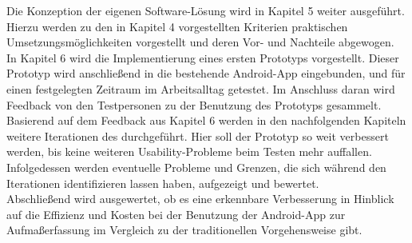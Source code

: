 Die Konzeption der eigenen Software-Lösung wird in Kapitel 5 weiter ausgeführt.
Hierzu werden zu den in Kapitel 4 vorgestellten Kriterien praktischen Umsetzungsmöglichkeiten vorgestellt und deren Vor- und Nachteile abgewogen. \\

In Kapitel 6 wird die Implementierung eines ersten Prototyps vorgestellt.
Dieser Prototyp wird anschließend in die bestehende Android-App eingebunden, und für einen festgelegten Zeitraum im Arbeitsalltag getestet.
Im Anschluss daran wird Feedback von den Testpersonen zu der Benutzung des Prototyps gesammelt. \\

Basierend auf dem Feedback aus Kapitel 6 werden in den nachfolgenden Kapiteln weitere Iterationen des \hcdp{} durchgeführt.
Hier soll der Prototyp so weit verbessert werden, bis keine weiteren Usability-Probleme beim Testen mehr auffallen. \\

Infolgedessen werden eventuelle Probleme und Grenzen, die sich während den Iterationen identifizieren lassen haben, aufgezeigt und bewertet. \\

Abschließend wird ausgewertet, ob es eine erkennbare Verbesserung in Hinblick auf die Effizienz und Kosten bei der Benutzung der Android-App zur Aufmaßerfassung im Vergleich zu der traditionellen Vorgehensweise gibt.
